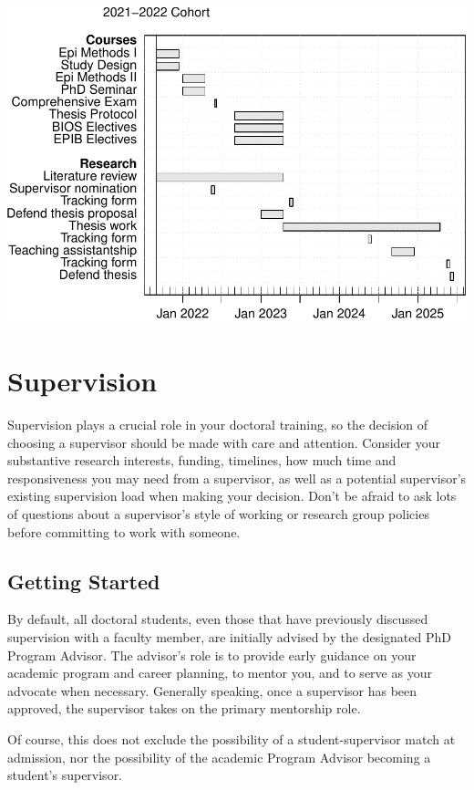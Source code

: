 \documentclass[
  openany]{book}
\begin{document}
\includegraphics{01-Introduction_files/figure-latex/plan-1.pdf}

\hypertarget{supervision}{%
\chapter{Supervision}\label{supervision}}

Supervision plays a crucial role in your doctoral training, so the decision of choosing a supervisor should be made with care and attention. Consider your substantive research interests, funding, timelines, how much time and responsiveness you may need from a supervisor, as well as a potential supervisor's existing supervision load when making your decision. Don't be afraid to ask lots of questions about a supervisor's style of working or research group policies before committing to work with someone.

\hypertarget{getting-started}{%
\section{Getting Started}\label{getting-started}}

By default, all doctoral students, even those that have previously discussed supervision with a faculty member, are initially advised by the designated PhD Program Advisor. The advisor's role is to provide early guidance on your academic program and career planning, to mentor you, and to serve as your advocate when necessary. Generally speaking, once a supervisor has been approved, the supervisor takes on the primary mentorship role.

Of course, this does not exclude the possibility of a student-supervisor match at admission, nor the possibility of the academic Program Advisor becoming a student's supervisor.
\end{document}
